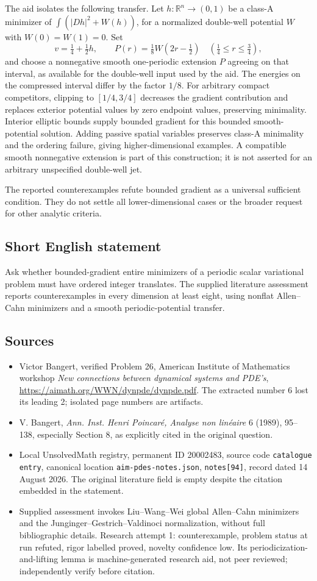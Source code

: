 \documentclass[11pt]{article}
\newcommand{\R}{\mathbb{R}}
\begin{document}
The aid isolates the following transfer. Let $h:\R^n\to(0,1)$ be a class-A minimizer of $\int(|Dh|^2+W(h))$, for a normalized double-well potential $W$ with $W(0)=W(1)=0$. Set
\[
 v=\tfrac14+\tfrac12h,
 \qquad P(r)=\tfrac18W(2r-\tfrac12)
       \quad(\tfrac14\le r\le\tfrac34),
\]
and choose a nonnegative smooth one-periodic extension $P$ agreeing on that interval, as available for the double-well input used by the aid. The energies on the compressed interval differ by the factor $1/8$. For arbitrary compact competitors, clipping to $[1/4,3/4]$ decreases the gradient contribution and replaces exterior potential values by zero endpoint values, preserving minimality. Interior elliptic bounds supply bounded gradient for this bounded smooth-potential solution. Adding passive spatial variables preserves class-A minimality and the ordering failure, giving higher-dimensional examples. A compatible smooth nonnegative extension is part of this construction; it is not asserted for an arbitrary unspecified double-well jet.

The reported counterexamples refute bounded gradient as a universal sufficient condition. They do not settle all lower-dimensional cases or the broader request for other analytic criteria.
\subsection{Short English statement}
Ask whether bounded-gradient entire minimizers of a periodic scalar variational problem must have ordered integer translates. The supplied literature assessment reports counterexamples in every dimension at least eight, using nonflat Allen--Cahn minimizers and a smooth periodic-potential transfer.
\subsection{Sources}
\begin{itemize}
\item Victor Bangert, verified Problem 26, American Institute of Mathematics workshop \emph{New connections between dynamical systems and PDE's}, \url{https://aimath.org/WWN/dynpde/dynpde.pdf}. The extracted number 6 lost its leading 2; isolated page numbers are artifacts.
\item V. Bangert, \emph{Ann. Inst. Henri Poincar\'e, Analyse non lin\'eaire} 6 (1989), 95--138, especially Section 8, as explicitly cited in the original question.
\item Local UnsolvedMath registry, permanent ID 20002483, source code \texttt{catalogue entry}, canonical location \texttt{aim-pdes-notes.json}, \texttt{notes[94]}, record dated 14 August 2026. The original literature field is empty despite the citation embedded in the statement.
\item Supplied assessment invokes Liu--Wang--Wei global Allen--Cahn minimizers and the Junginger--Gestrich--Valdinoci normalization, without full bibliographic details. Research attempt 1: counterexample, problem status at run refuted, rigor labelled proved, novelty confidence low. Its periodicization-and-lifting lemma is machine-generated research aid, not peer reviewed; independently verify before citation.
\end{itemize}
\end{document}
